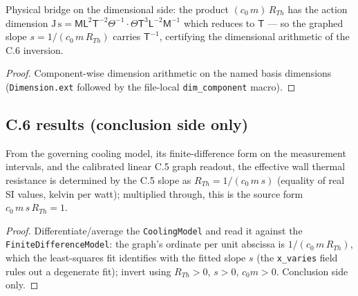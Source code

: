 \begin{lemma}
\label{lem:IPhO2026Problems_problem_IPhO_2026_4_C_6:slope_inversion_is_dimensionally_correct}
Physical bridge on the dimensional side: the product
$(c_0\,m)\,R_{Th}$ has the action dimension $\mathrm{J\,s} =
\mathsf{M}\mathsf{L}^2\mathsf{T}^{-2}\Theta^{-1}\cdot
\Theta\mathsf{T}^3\mathsf{L}^{-2}\mathsf{M}^{-1}$
which reduces to $\mathsf{T}$ — so the graphed slope
$s = 1/(c_0\,m\,R_{Th})$ carries $\mathsf{T}^{-1}$, certifying the
dimensional arithmetic of the C.6 inversion.
\end{lemma}
\begin{proof}
Component-wise dimension arithmetic on the named basis dimensions
(\texttt{Dimension.ext} followed by the file-local \texttt{dim\_component}
macro).
\end{proof}

\subsection*{C.6 results (conclusion side only)}

\begin{theorem}
\label{thm:IPhO2026Problems_problem_IPhO_2026_4_C_6:wall_thermal_resistance_from_C5}
From the governing cooling model, its finite-difference form on the
measurement intervals, and the calibrated linear C.5 graph readout, the
effective wall thermal resistance is determined by the C.5 slope as
$R_{Th} = 1/(c_0\,m\,s)$ (equality of real SI values, kelvin per watt);
multiplied through, this is the source form $c_0\,m\,s\,R_{Th} = 1$.
\end{theorem}
\begin{proof}
Differentiate/average the \texttt{CoolingModel} and read it against the
\texttt{FiniteDifferenceModel}: the graph's ordinate per unit abscissa is
$1/(c_0\,m\,R_{Th})$, which the least-squares fit identifies with the
fitted slope $s$ (the \texttt{x\_varies} field rules out a degenerate fit);
invert using $R_{Th} > 0$, $s > 0$, $c_0 m > 0$. Conclusion side only.
\end{proof}

